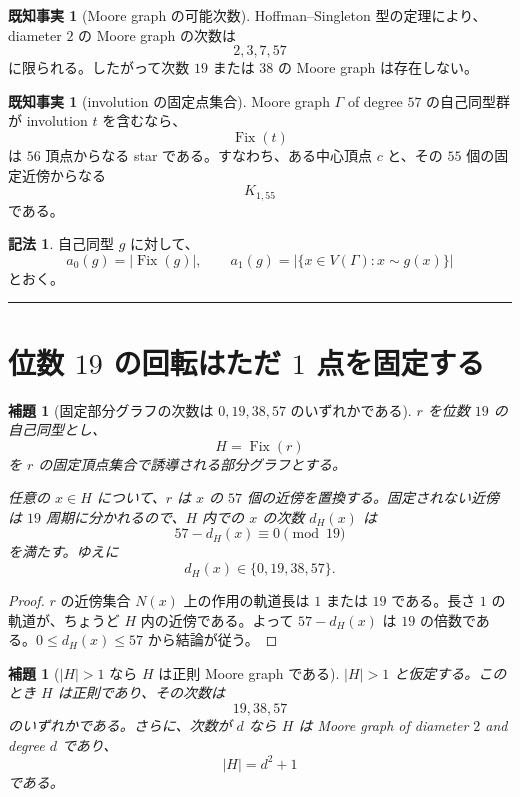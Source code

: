 \documentclass[11pt,a4paper]{article}
\theoremstyle{plain}
\newtheorem{lemma}[theorem]{補題}
\theoremstyle{definition}
\newtheorem{fact}[theorem]{既知事実}
\newtheorem{notation}[theorem]{記法}
\theoremstyle{remark}
\DeclareMathOperator{\Fix}{Fix}
\begin{document}
\begin{fact}[Moore graph の可能次数]
Hoffman--Singleton 型の定理により、diameter $2$ の Moore graph の次数は
\[
2,3,7,57
\]
に限られる。したがって次数 $19$ または $38$ の Moore graph は存在しない。
\end{fact}

\begin{fact}[involution の固定点集合]
Moore graph $\Gamma$ of degree $57$ の自己同型群が involution $t$ を含むなら、
\[
\Fix(t)
\]
は $56$ 頂点からなる star である。すなわち、ある中心頂点 $c$ と、その $55$ 個の固定近傍からなる
\[
K_{1,55}
\]
である。
\end{fact}

\begin{notation}
自己同型 $g$ に対して、
\[
a_0(g) = |\Fix(g)|, \qquad
a_1(g) = |\{x \in V(\Gamma) : x \sim g(x)\}|
\]
とおく。
\end{notation}

\bigskip
\hrule
\bigskip

\section{位数 $19$ の回転はただ $1$ 点を固定する}

\begin{lemma}[固定部分グラフの次数は $0,19,38,57$ のいずれかである]\label{lem:degH}
$r$ を位数 $19$ の自己同型とし、
\[
H = \Fix(r)
\]
を $r$ の固定頂点集合で誘導される部分グラフとする。

任意の $x \in H$ について、$r$ は $x$ の $57$ 個の近傍を置換する。固定されない近傍は $19$ 周期に分かれるので、$H$ 内での $x$ の次数 $d_H(x)$ は
\[
57 - d_H(x) \equiv 0 \pmod{19}
\]
を満たす。ゆえに
\[
d_H(x) \in \{0,19,38,57\}.
\]
\end{lemma}

\begin{proof}
$r$ の近傍集合 $N(x)$ 上の作用の軌道長は $1$ または $19$ である。長さ $1$ の軌道が、ちょうど $H$ 内の近傍である。よって $57 - d_H(x)$ は $19$ の倍数である。$0 \le d_H(x) \le 57$ から結論が従う。
\end{proof}

\begin{lemma}[$|H|>1$ なら $H$ は正則 Moore graph である]\label{lem:HMoore}
$|H|>1$ と仮定する。このとき $H$ は正則であり、その次数は
\[
19,38,57
\]
のいずれかである。さらに、次数が $d$ なら $H$ は Moore graph of diameter $2$ and degree $d$ であり、
\[
|H| = d^2 + 1
\]
である。
\end{lemma}
\end{document}
